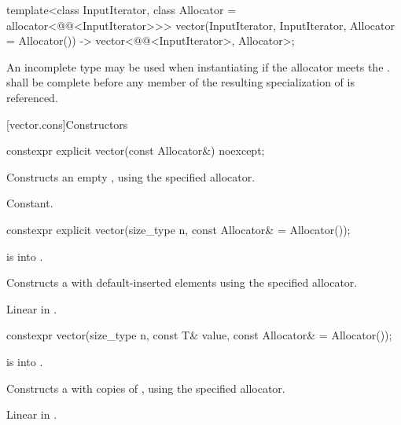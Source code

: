 \begin{codeblock}
{  template<class InputIterator, class Allocator = allocator<@@<InputIterator>>>
    vector(InputIterator, InputIterator, Allocator = Allocator())
      -> vector<@@<InputIterator>, Allocator>;
}
\end{codeblock}%
%

\pnum
An incomplete type  may be used when instantiating 
if the allocator meets the
.
 shall be complete before any member of the resulting specialization
of  is referenced.

[vector.cons]{Constructors}

\begin{itemdecl}
constexpr explicit vector(const Allocator&) noexcept;
\end{itemdecl}

\begin{itemdescr}
\pnum
\effects
Constructs an empty , using the
specified allocator.

\pnum
\complexity
Constant.
\end{itemdescr}

\begin{itemdecl}
constexpr explicit vector(size_type n, const Allocator& = Allocator());
\end{itemdecl}

\begin{itemdescr}
\pnum
\expects
{} is  into .

\pnum
\effects
Constructs a  with 
default-inserted elements using the specified allocator.

\pnum
\complexity
Linear in .
\end{itemdescr}

\begin{itemdecl}
constexpr vector(size_type n, const T& value,
                 const Allocator& = Allocator());
\end{itemdecl}

\begin{itemdescr}
\pnum
\expects
{} is
 into .

\pnum
\effects
Constructs a  with 
copies of , using the specified allocator.

\pnum
\complexity
Linear in .
\end{itemdescr}

